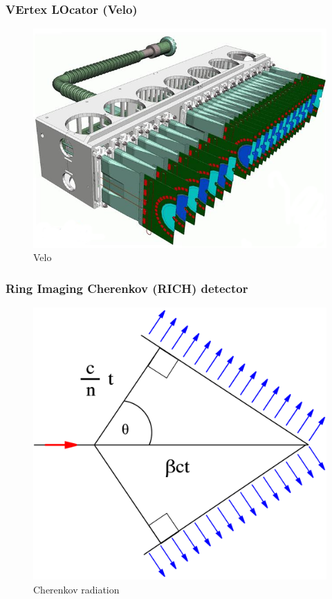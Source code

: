\documentclass{beamer}
\begin{document}

\begin{frame}
  \frametitle{VErtex LOcator (Velo)}

  \begin{figure}
    \includegraphics[width=0.8\linewidth]{figures/velo}
    \caption{Velo}
  \end{figure}

\end{frame}


\begin{frame}
  \frametitle{Ring Imaging Cherenkov (RICH) detector}

  \begin{figure}
    \includegraphics[width=0.5\linewidth]{figures/Cherenkov}
    \caption{Cherenkov radiation}
  \end{figure}

\end{frame}

\end{document}
